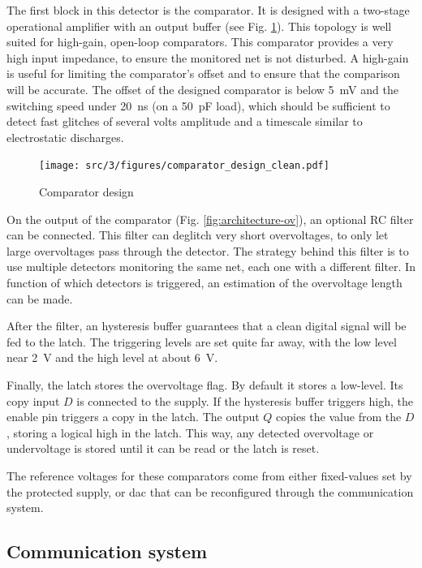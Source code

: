 The first block in this detector is the comparator.
It is designed with a two-stage operational amplifier with an output buffer (see Fig. \ref{fig:comparator-design}).
This topology is well suited for high-gain, open-loop comparators.
This comparator provides a very high input impedance, to ensure the monitored net is not disturbed.
A high-gain is useful for limiting the comparator's offset and to ensure that the comparison will be accurate.
The offset of the designed comparator is below \SI{5}{\milli\volt} and the switching speed under \SI{20}{\nano\second} (on a \SI{50}{\pico\farad} load), which should be sufficient to detect fast glitches of several volts amplitude and a timescale similar to electrostatic discharges.

\begin{figure}[!h]
  \centering
  \texttt{[image: src/3/figures/comparator\_design\_clean.pdf]}
  \caption{Comparator design}
  \label{fig:comparator-design}
\end{figure}

On the output of the comparator (Fig. \ref{fig:architecture-ov}), an optional RC filter can be connected.
This filter can deglitch very short overvoltages, to only let large overvoltages pass through the detector.
The strategy behind this filter is to use multiple detectors monitoring the same net, each one with a different filter.
In function of which detectors is triggered, an estimation of the overvoltage length can be made.

After the filter, an hysteresis buffer guarantees that a clean digital signal will be fed to the latch.
The triggering levels are set quite far away, with the low level near \SI{2}{\volt} and the high level at about \SI{6}{\volt}.

Finally, the latch stores the overvoltage flag.
By default it stores a low-level.
Its copy input $D$ is connected to the supply.
If the hysteresis buffer triggers high, the enable pin triggers a copy in the latch.
The output $Q$ copies the value from the $D$, storing a logical high in the latch.
This way, any detected overvoltage or undervoltage is stored until it can be read or the latch is reset.

The reference voltages for these comparators come from either fixed-values set by the protected supply, or \gls{dac} that can be reconfigured through the communication system.

\subsection{Communication system}
\label{sec:comm-system-testchip}

